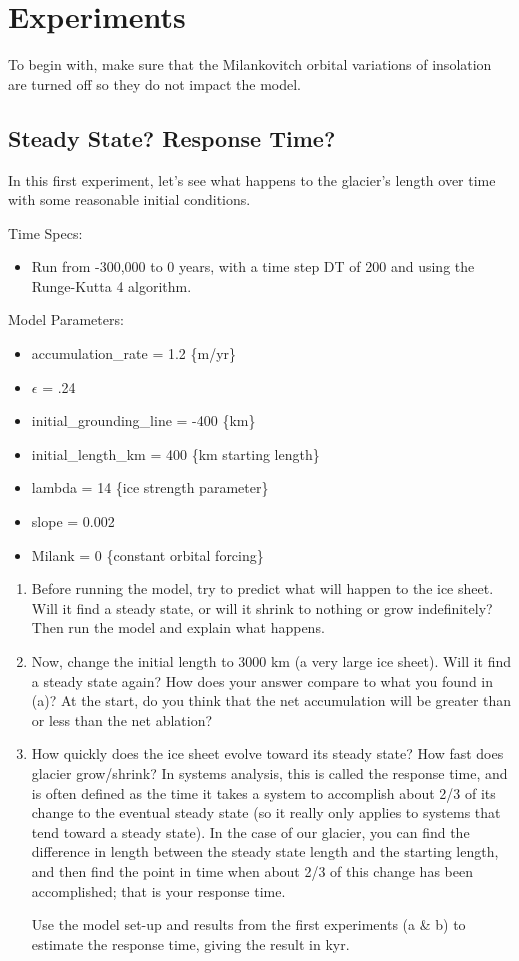 \documentclass[11pt,letterpaper]{article}
\begin{document}
\section{Experiments}

To begin with, make sure that the Milankovitch orbital variations of insolation are turned off so they do not impact the model.

\subsection{Steady State?  Response Time?\label{model:initial}}
In this first experiment, let’s see what happens to the glacier’s length over time with some reasonable initial conditions.

Time Specs:
\begin{itemize}
\item Run from -300,000 to 0 years, with a time step DT of 200 and using the Runge-Kutta 4 algorithm.
\end{itemize}
Model Parameters:
\begin{itemize}
\item accumulation\_rate = 1.2 \{m/yr\}
\item $\epsilon$ =  .24
\item initial\_grounding\_line = -400 \{km\}
\item initial\_length\_km = 400 \{km starting length\}
\item lambda = 14 \{ice strength parameter\}
\item slope = 0.002
\item Milank = 0 \{constant orbital forcing\}
\end{itemize}

\begin{enumerate}[label=(\alph*)]
\item Before running the model, try to predict what will happen to the ice sheet.  Will it find a steady state, or will it shrink to nothing or grow indefinitely?  Then run the model and explain what happens.

\item Now, change the initial length to 3000 km (a very large ice sheet).  Will it find a steady state again? How does your answer compare to what you found in (a)?  At the start, do you think that the net accumulation will be greater than or less than the net ablation?

\item How quickly does the ice sheet evolve toward its steady state? How fast does glacier grow/shrink?  In systems analysis, this is called the response time, and is often defined as the time it takes a system to accomplish about 2/3 of its change to the eventual steady state (so it really only applies to systems that tend toward a steady state). In the case of our glacier, you can find the difference in length between the steady state length and the starting length, and then find the point in time when about 2/3 of this change has been accomplished; that is your response time.

Use the model set-up and results from the first experiments (a \& b) to estimate the response time, giving the result in kyr.
\end{enumerate}
\end{document}

